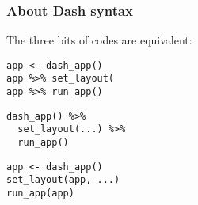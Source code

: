 \documentclass{beamer}
\begin{document}
	\begin{frame}[fragile]
		\frametitle{About Dash syntax}

		The three bits of codes are equivalent:

		\begin{exampleblock}{}
		\begin{BVerbatim}
app <- dash_app()
app %
app %
		\end{BVerbatim}
		\end{exampleblock}{}

		\begin{exampleblock}{}
		\begin{BVerbatim}		
dash_app() %
  set_layout(...) %
  run_app()
		\end{BVerbatim}
		\end{exampleblock}{}

		\begin{exampleblock}{}
		\begin{BVerbatim}
app <- dash_app()
set_layout(app, ...)
run_app(app)
		\end{BVerbatim}
		\end{exampleblock}{}

	\end{frame}
\end{document}
